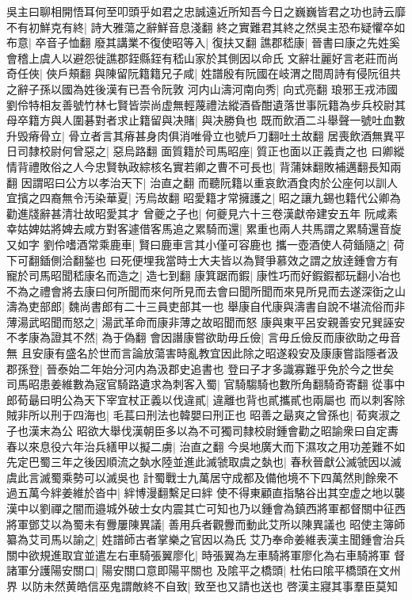 吳主曰聊相開悟耳何至叩頭乎如君之忠誠遠近所知吾今日之巍巍皆君之功也詩云靡不有初鮮克有終|{
	詩大雅蕩之辭鮮音息淺翻}
終之實難君其終之然吳主恐布疑懼卒如布意|{
	卒音子恤翻}
廢其講業不復使昭等入|{
	復扶又翻}
譙郡嵇康|{
	晉書曰康之先姓奚會稽上虞人以避怨徙譙郡銍縣銍有嵇山家於其側因以命氏}
文辭壮麗好言老莊而尚奇任俠|{
	俠戶頰翻}
與陳留阮籍籍兄子咸|{
	姓譜殷有阮國在岐渭之間周詩有侵阮徂共之辭子孫以國為姓後漢有已吾令阮敦}
河内山濤河南向秀|{
	向式亮翻}
琅邪王戎沛國劉伶特相友善號竹林七賢皆崇尚虚無輕蔑禮法縱酒昏酣遺落世事阮籍為步兵校尉其母卒籍方與人圍碁對者求止籍留與决賭|{
	與决勝負也}
既而飲酒二斗舉聲一號吐血數升毁瘠骨立|{
	骨立者言其瘠甚身肉俱消唯骨立也號戶刀翻吐土故翻}
居喪飲酒無異平日司隸校尉何曾惡之|{
	惡烏路翻}
面質籍於司馬昭座|{
	質正也面以正義責之也}
曰卿縱情背禮敗俗之人今忠賢執政綜核名實若卿之曹不可長也|{
	背蒲妹翻敗補邁翻長知兩翻}
因謂昭曰公方以孝治天下|{
	治直之翻}
而聽阮籍以重哀飲酒食肉於公座何以訓人宜擯之四裔無令汚染華夏|{
	汚烏故翻}
昭愛籍才常擁護之|{
	昭之讓九錫也籍代公卿為勸進牋辭甚清壮故昭愛其才}
曾夔之子也|{
	何夔見六十三卷漢獻帝建安五年}
阮咸素幸姑婢姑將婢去咸方對客遽借客馬追之累騎而還|{
	累重也兩人共馬謂之累騎還音旋又如字}
劉伶嗜酒常乘鹿車|{
	賢曰鹿車言其小僅可容鹿也}
攜一壺酒使人荷鍤隨之|{
	荷下可翻鍤側洽翻鍫也}
曰死便埋我當時士大夫皆以為賢爭慕效之謂之放逹鍾會方有寵於司馬昭聞嵇康名而造之|{
	造七到翻}
康箕踞而鍜|{
	康性巧而好鍜鍜都玩翻小冶也}
不為之禮會將去康曰何所聞而來何所見而去會曰聞所聞而來見所見而去遂深衘之山濤為吏部郎|{
	魏尚書郎有二十三員吏部其一也}
舉康自代康與濤書自說不堪流俗而非薄湯武昭聞而怒之|{
	湯武革命而康非薄之故昭聞而怒}
康與東平呂安親善安兄巽誣安不孝康為證其不然|{
	為于偽翻}
會因譖康嘗欲助毋丘儉|{
	言毋丘儉反而康欲助之毋音無}
且安康有盛名於世而言論放蕩害時亂教宜因此除之昭遂殺安及康康嘗詣隱者汲郡孫登|{
	晉泰始二年始分河内為汲郡史追書也}
登曰子才多識寡難乎免於今之世矣　司馬昭患姜維數為宼官騎路遺求為刺客入蜀|{
	官騎騶騎也數所角翻騎奇寄翻}
從事中郎荀朂曰明公為天下宰宜杖正義以伐違貳|{
	違離也背也貳攜貳也兩屬也}
而以刺客除賊非所以刑于四海也|{
	毛萇曰刑法也韓嬰曰刑正也}
昭善之朂爽之曾孫也|{
	荀爽淑之子也漢末為公}
昭欲大舉伐漢朝臣多以為不可獨司隸校尉鍾會勸之昭諭衆曰自定夀春以來息役六年治兵繕甲以擬二虜|{
	治直之翻}
今吳地廣大而下濕攻之用功差難不如先定巴蜀三年之後因順流之埶水陸並進此滅虢取虞之埶也|{
	春秋晉獻公滅虢因以滅虞此言滅蜀乘勢可以滅吳也}
計蜀戰士九萬居守成都及備他境不下四萬然則餘衆不過五萬今絆姜維於沓中|{
	絆博漫翻繫足曰絆}
使不得東顧直指駱谷出其空虚之地以襲漢中以劉禪之闇而邉城外破士女内震其亡可知也乃以鍾會為鎮西將軍都督關中征西將軍鄧艾以為蜀未有釁屢陳異議|{
	善用兵者觀釁而動此艾所以陳異議也}
昭使主簿師纂為艾司馬以諭之|{
	姓譜師古者掌樂之官因以為氏}
艾乃奉命姜維表漢主聞鍾會治兵關中欲規進取宜並遣左右車騎張翼廖化|{
	時張翼為左車騎將軍廖化為右車騎將軍}
督諸軍分護陽安關口|{
	陽安關口意即陽平關也}
及隂平之橋頭|{
	杜佑曰隂平橋頭在文州界}
以防未然黄皓信巫鬼謂敵終不自致|{
	致至也又請也送也}
啓漢主寢其事羣臣莫知

